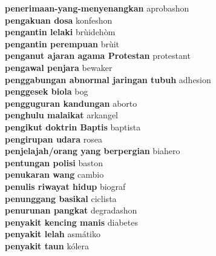 \textbf{ penerimaan-yang-menyenangkan  } aprobashon \\
\textbf{ pengakuan dosa  } konfeshon \\
\textbf{ pengantin lelaki  } brùidehòm \\
\textbf{ pengantin perempuan  } brùit \\
\textbf{ penganut ajaran agama Protestan  } protestant \\
\textbf{ pengawal penjara  } bewaker \\
\textbf{ penggabungan abnormal jaringan tubuh  } adhesion \\
\textbf{ penggesek biola  } bog \\
\textbf{ pengguguran kandungan  } aborto \\
\textbf{ penghulu malaikat  } arkangel \\
\textbf{ pengikut doktrin Baptis  } baptista \\
\textbf{ pengirupan udara  } rosea \\
\textbf{ penjelajah/orang yang berpergian  } biahero \\
\textbf{ pentungan polisi  } baston \\
\textbf{ penukaran wang  } cambio \\
\textbf{ penulis riwayat hidup  } biograf \\
\textbf{ penunggang basikal  } ciclista \\
\textbf{ penurunan pangkat  } degradashon \\
\textbf{ penyakit kencing manis  } diabetes \\
\textbf{ penyakit lelah  } asmátiko \\
\textbf{ penyakit taun  } kólera \\
